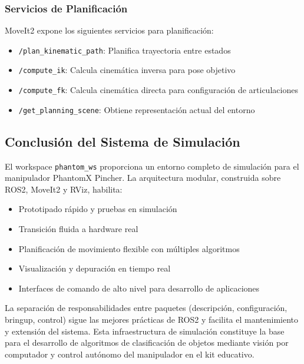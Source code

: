 \subsubsection{Servicios de Planificación}

MoveIt2 expone los siguientes servicios para planificación:

\begin{itemize}
    \item \texttt{/plan\_kinematic\_path}: Planifica trayectoria entre estados
    \item \texttt{/compute\_ik}: Calcula cinemática inversa para pose objetivo
    \item \texttt{/compute\_fk}: Calcula cinemática directa para configuración de articulaciones
    \item \texttt{/get\_planning\_scene}: Obtiene representación actual del entorno
\end{itemize}

\subsection{Conclusión del Sistema de Simulación}

El workspace \texttt{phantom\_ws} proporciona un entorno completo de simulación para el manipulador PhantomX Pincher. La arquitectura modular, construida sobre ROS2, MoveIt2 y RViz, habilita:

\begin{itemize}
    \item Prototipado rápido y pruebas en simulación
    \item Transición fluida a hardware real
    \item Planificación de movimiento flexible con múltiples algoritmos
    \item Visualización y depuración en tiempo real
    \item Interfaces de comando de alto nivel para desarrollo de aplicaciones
\end{itemize}

La separación de responsabilidades entre paquetes (descripción, configuración, bringup, control) sigue las mejores prácticas de ROS2 y facilita el mantenimiento y extensión del sistema. Esta infraestructura de simulación constituye la base para el desarrollo de algoritmos de clasificación de objetos mediante visión por computador y control autónomo del manipulador en el kit educativo.